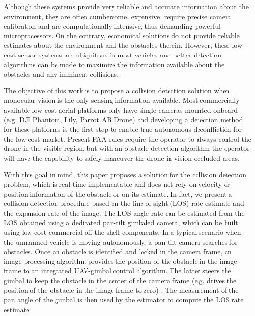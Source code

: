 \documentclass[]{aiaa-tc}%
\begin{document}
Although these systems provide very reliable and accurate information about the environment, they are often cumbersome, expensive, require precise camera calibration and are computationally intensive, thus demanding powerful microprocessors. On the contrary, economical solutions do not provide reliable estimates about the environment and the obstacles therein. However, these low-cost sensor systems are ubiquitous in most vehicles and better detection algorithms can be made to maximize the information available about the obstacles and any imminent collisions.

The objective of this work is to propose a collision detection solution when monocular vision is the only sensing information available. Most commercially available low cost aerial platforms only have single cameras mounted onboard (e.g. DJI Phantom, Lily, Parrot AR Drone) and developing a detection method for these platforms is the first step to enable true autonomous deconfliction for the low cost market. Present FAA rules require the operator to always control the drone in the visible region, but with an obstacle detection algorithm the operator will have the capability to safely maneuver the drone in vision-occluded areas.


With this goal in mind, this paper proposes a solution for the collision detection problem, which is real-time implementable and does not rely on velocity or position information of the obstacle or on its estimate. In fact, we present a collision detection procedure based on the line-of-sight (LOS) rate estimate and the expansion rate of the image. The LOS angle rate can be estimated from the LOS obtained using a dedicated pan-tilt gimbaled camera, which can be built using low-cost commercial off-the-shelf components. In a typical scenario when the unmanned vehicle is moving autonomously, a pan-tilt camera searches for obstacles. Once an obstacle is identified and locked in the camera frame, an image processing algorithm \cite{PerceptiVU} provides the position of the obstacle in the image frame to an integrated UAV-gimbal control algorithm. The latter steers the gimbal to keep the obstacle in the center of the camera frame (e.g. drives the position of the obstacle in the image frame to zero) \cite{dobrokhodov2008vision}. The measurement of the  pan angle of the gimbal is then used by the estimator to compute the LOS rate estimate.
\end{document}

